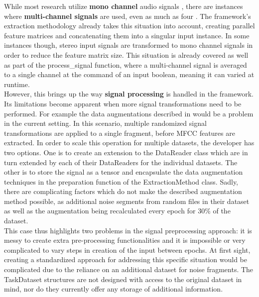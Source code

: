 While most research utilize \textbf{mono channel} audio signals \cite{seltzer2013multi} \cite{panchapagesan2016multi} \cite{kim2017speech}, there are instances where \textbf{multi-channel signals} are used, even as much as four \cite{nwe2017convolutional}. The framework's extraction methodology already takes this situation into account, creating parallel feature matrices and concatenating them into a singular input instance. In some instances though, stereo input signals are transformed to mono channel signals in order to reduce the feature matrix size. This situation is already covered as well as part of the process\_signal function, where a multi-channel signal is averaged to a single channel at the command of an input boolean, meaning it can varied at runtime.\\

However, this brings up the way \textbf{signal processing} is handled in the framework. Its limitations become apparent when more signal transformations need to be performed. For example the data augmentations described in \cite{lopez2019keyword} would be a problem in the current setting. In this scenario, multiple randomized signal transformations are applied to a single fragment, before MFCC features are extracted. In order to scale this operation for multiple datasets, the developer has two options. One is to create an extension to the DataReader class which are in turn extended by each of their DataReaders for the individual datasets. The other is to store the signal as a tensor and encapsulate the data augmentation techniques in the preparation function of the ExtractionMethod class. Sadly, there are complicating factors which do not make the described augmentation method possible, as additional noise segments from random files in their dataset as well as the augmentation being recalculated every epoch for 30\% of the dataset. \\

This case thus highlights two problems in the signal preprocessing approach: it is messy to create extra pre-processing functionalities and it is impossible or very complicated to vary steps in creation of the input between epochs. At first sight, creating a standardized approach for addressing this specific situation would be complicated due to the reliance on an additional dataset for noise fragments. The TaskDataset structures are not designed with access to the original dataset in mind, nor do they currently offer any storage of additional information.\\

